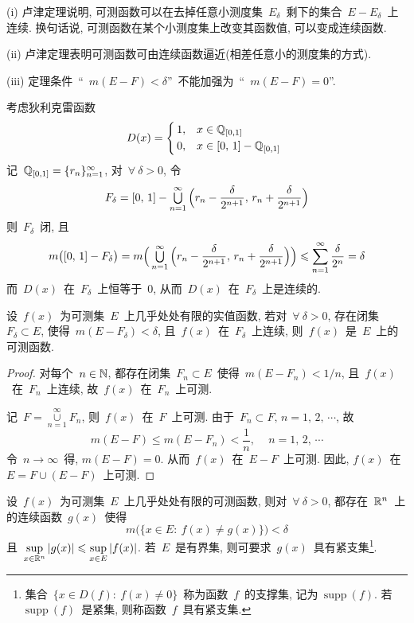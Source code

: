 \begin{remark}
(i) 卢津定理说明, 可测函数可以在去掉任意小测度集~$E_\delta$~剩下的集合~$E - E_\delta$~上连续. 换句话说, 可测函数在某个小测度集上改变其函数值, 可以变成连续函数.

(ii) 卢津定理表明可测函数可由连续函数逼近(相差任意小的测度集的方式).

(iii) 定理条件~``~$m(E - F) < \delta$''~不能加强为~``~$m(E - F) = 0$''.
\end{remark}

\begin{example}
考虑狄利克雷函数
\[
D(x) = \left\{ \!\!
\begin{array}{ll}
1, & x \in \mathbb{Q}_{[0,1]} \\[0.1cm]
0, & x \in [0,\,1]-\mathbb{Q}_{[0,1]}
\end{array}
\right.
\]
记~$\mathbb{Q}_{[0,1]} = \{r_n\}_{n=1}^\infty$, 对~$\forall~\delta > 0$, 令
\[
F_\delta = [0,\,1] - \mathop{\textstyle{\bigcup}}_{n=1}^\infty \Big( r_n - \frac{\delta}{2^{n+1}},\, r_n + \frac{\delta}{2^{n+1}} \Big)
\]
则~$F_\delta$~闭, 且
\[
m\big([0,\,1] - F_\delta \big) = m \Big( \mathop{\textstyle{\bigcup}}_{n=1}^\infty \Big( r_n - \frac{\delta}{2^{n+1}},\, r_n + \frac{\delta}{2^{n+1}} \Big) \Big) \leqslant \sum_{n=1}^\infty \frac{\delta}{2^n} = \delta
\]
而~$D(x)$~在~$F_\delta$~上恒等于~$0$, 从而~$D(x)$~在~$F_\delta$~上是连续的.
\end{example}

\begin{theorem}
设~$f(x)$~为可测集~$E$~上几乎处处有限的实值函数, 若对~$\forall~\delta > 0$, 存在闭集~$F_\delta \subset E$, 使得~$m(E - F_\delta) < \delta$, 且~$f(x)$~在~$F_\delta$~上连续, 则~$f(x)$~是~$E$~上的可测函数.
\end{theorem}

\begin{proof}
对每个~$n \in \mathbb{N}$, 都存在闭集~$F_n \subset E$~使得~$m(E - F_n) < 1/n$, 且~$f(x)$~在~$F_n$~上连续, 故~$f(x)$~在~$F_n$~上可测.

记~$F = \mathop{\cup}\limits_{n=1}^\infty F_n$, 则~$f(x)$~在~$F$~上可测. 由于~$F_n \subset F, \, n = 1,\,2,\,\cdots$, 故
\[
m(E - F) \leqslant m(E - F_n) < \frac{1}{n}, \, \quad n = 1,\,2,\,\cdots
\]
令~$n \to \infty$~得, $m(E - F) = 0$. 从而~$f(x)$~在~$E - F$~上可测. 因此, $f(x)$~在~$E = F \cup (E - F)$~上可测.
\end{proof}

\begin{theorem} \label{thm333}
设~$f(x)$~为可测集~$E$~上几乎处处有限的可测函数, 则对~$\forall~\delta > 0$, 都存在~$\mathbb{R}^n$~上的连续函数~$g(x)$~使得
\[
m\big(\{x \in E: \: f(x) \neq g(x)\} \big) < \delta
\]
且~$\sup\limits_{x \in \mathbb{R}^n} |g(x)| \leqslant \sup\limits_{x \in E} |f(x)|$. 若~$E$~是有界集, 则可要求~$g(x)$~具有紧支集\footnote{集合~$\{x \in D(f): \: f(x) \neq 0\}$~称为函数~$f$~的支撑集, 记为~$\mathrm{supp~}\!(f)$. 若~$\mathrm{supp~}\!(f)$~是紧集, 则称函数~$f$~具有紧支集. }.
\end{theorem}

